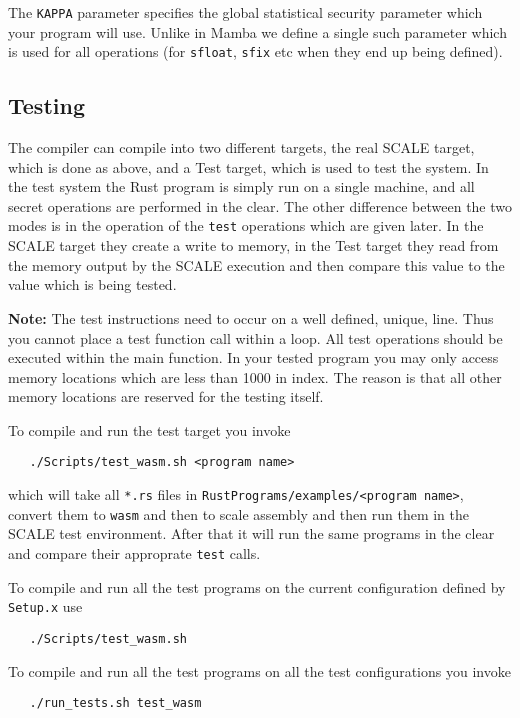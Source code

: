 The \verb|KAPPA| parameter specifies the global statistical security 
parameter which your program will use. Unlike in Mamba we define a
single such parameter which is used for all operations (for
\verb|sfloat|, \verb|sfix| etc when they end up being defined).


\subsection{Testing}
The compiler can compile into two different targets,
the real SCALE target, which is done as above,
and a Test target, which is used to test the system.
In the test system the Rust program is simply run on a single
machine, and all secret operations are performed in the clear.
The other difference between the two modes is in the operation
of the \verb|test| operations which are given later.
In the SCALE target they create a write to memory, in the
Test target they read from the memory output by the SCALE
execution and then compare this value to the value which
is being tested.

\vspace{3mm}

\noindent
{\bf Note:} The test instructions need to occur on a well
defined, unique, line. Thus you cannot place a test function call
within a loop. All test operations should be executed within
the main function.
In your tested program you may only access memory locations
which are less than 1000 in index. The reason is that all
other memory locations are reserved for the testing itself.

To compile and run the test target you invoke
\begin{verbatim}
   ./Scripts/test_wasm.sh <program name>
\end{verbatim}
which will take all \verb|*.rs| files in \verb|RustPrograms/examples/<program name>|,
convert them to \verb|wasm| and then to scale assembly and then run
them in the SCALE test environment. After that it will run the
same programs in the clear and compare their approprate \verb|test| calls.

To compile and run all the test programs on the current configuration
defined by \verb|Setup.x| use
\begin{verbatim}
   ./Scripts/test_wasm.sh
\end{verbatim}
To compile and run all the test programs on all the test configurations you invoke
\begin{verbatim}
   ./run_tests.sh test_wasm
\end{verbatim}

